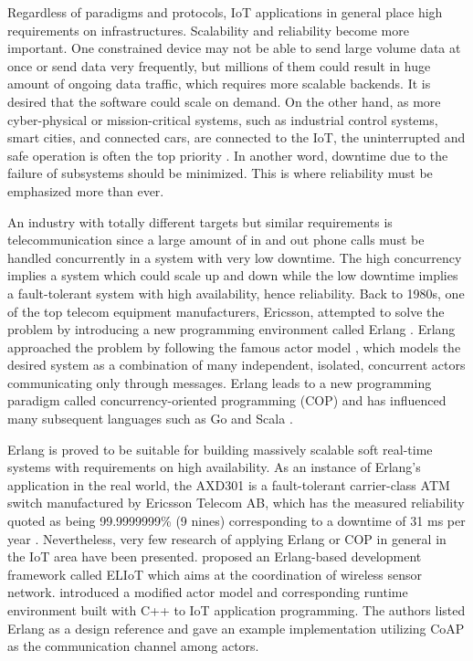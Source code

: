 Regardless of paradigms and protocols, IoT applications in general place high requirements on infrastructures. Scalability and reliability become more important. One constrained device may not be able to send large volume data at once or send data very frequently, but millions of them could result in huge amount of ongoing data traffic, which requires more scalable backends. It is desired that the software could scale on demand. On the other hand, as more cyber-physical or mission-critical systems, such as industrial control systems, smart cities, and connected cars, are connected to the IoT, the uninterrupted and safe operation is often the top priority \autocite{7498684}. In another word, downtime due to the failure of subsystems should be minimized. This is where reliability must be emphasized more than ever. 

An industry with totally different targets but similar requirements is telecommunication since a large amount of in and out phone calls must be handled concurrently in a system with very low downtime. The high concurrency implies a system which could scale up and down while the low downtime implies a fault-tolerant system with high availability, hence reliability. Back to 1980s, one of the top telecom equipment manufacturers, Ericsson, attempted to solve the problem by introducing a new programming environment called Erlang \autocite{erl}. Erlang approached the problem by following the famous actor model \autocite{agha1986actors}, which models the desired system as a combination of many independent, isolated, concurrent actors communicating only through messages. Erlang leads to a new programming paradigm called concurrency-oriented programming (COP) \autocite{armstrong2003concurrency} and has influenced many subsequent languages such as Go \autocite{go} and Scala \autocite{scala}.  

Erlang is proved to be suitable for building massively scalable soft real-time systems with requirements on high availability. As an instance of Erlang's application in the real world, the AXD301 is a fault-tolerant carrier-class ATM switch manufactured by Ericsson Telecom AB, which has the measured reliability quoted as being 99.9999999\% (9 nines) corresponding to a downtime of 31 ms per year \autocite{armstrong2003concurrency}. Nevertheless, very few research of applying Erlang or COP in general in the IoT area have been presented. \textcite{Sivieri:2012:DPT:2667049.2667051} proposed an Erlang-based development framework called ELIoT which aims at the coordination of wireless sensor network. \textcite{7034296} introduced a modified actor model and corresponding runtime environment built with C++ to IoT application programming. The authors listed Erlang as a design reference and gave an example implementation utilizing CoAP as the communication channel among actors.  

